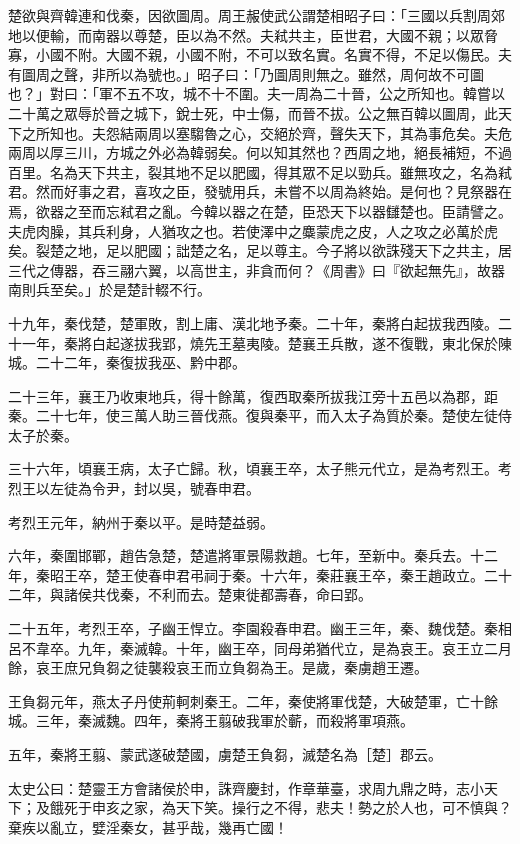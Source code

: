 \begin{pinyinscope}
楚欲與齊韓連和伐秦，因欲圖周。周王赧使武公謂楚相昭子曰：「三國以兵割周郊地以便輸，而南器以尊楚，臣以為不然。夫弒共主，臣世君，大國不親；以眾脅寡，小國不附。大國不親，小國不附，不可以致名實。名實不得，不足以傷民。夫有圖周之聲，非所以為號也。」昭子曰：「乃圖周則無之。雖然，周何故不可圖也？」對曰：「軍不五不攻，城不十不圍。夫一周為二十晉，公之所知也。韓嘗以二十萬之眾辱於晉之城下，銳士死，中士傷，而晉不拔。公之無百韓以圖周，此天下之所知也。夫怨結兩周以塞騶魯之心，交絕於齊，聲失天下，其為事危矣。夫危兩周以厚三川，方城之外必為韓弱矣。何以知其然也？西周之地，絕長補短，不過百里。名為天下共主，裂其地不足以肥國，得其眾不足以勁兵。雖無攻之，名為弒君。然而好事之君，喜攻之臣，發號用兵，未嘗不以周為終始。是何也？見祭器在焉，欲器之至而忘弒君之亂。今韓以器之在楚，臣恐天下以器讎楚也。臣請譬之。夫虎肉臊，其兵利身，人猶攻之也。若使澤中之麋蒙虎之皮，人之攻之必萬於虎矣。裂楚之地，足以肥國；詘楚之名，足以尊主。今子將以欲誅殘天下之共主，居三代之傳器，吞三翮六翼，以高世主，非貪而何？《周書》曰『欲起無先』，故器南則兵至矣。」於是楚計輟不行。

十九年，秦伐楚，楚軍敗，割上庸、漢北地予秦。二十年，秦將白起拔我西陵。二十一年，秦將白起遂拔我郢，燒先王墓夷陵。楚襄王兵散，遂不復戰，東北保於陳城。二十二年，秦復拔我巫、黔中郡。

二十三年，襄王乃收東地兵，得十餘萬，復西取秦所拔我江旁十五邑以為郡，距秦。二十七年，使三萬人助三晉伐燕。復與秦平，而入太子為質於秦。楚使左徒侍太子於秦。

三十六年，頃襄王病，太子亡歸。秋，頃襄王卒，太子熊元代立，是為考烈王。考烈王以左徒為令尹，封以吳，號春申君。

考烈王元年，納州于秦以平。是時楚益弱。

六年，秦圍邯鄲，趙告急楚，楚遣將軍景陽救趙。七年，至新中。秦兵去。十二年，秦昭王卒，楚王使春申君弔祠于秦。十六年，秦莊襄王卒，秦王趙政立。二十二年，與諸侯共伐秦，不利而去。楚東徙都壽春，命曰郢。

二十五年，考烈王卒，子幽王悍立。李園殺春申君。幽王三年，秦、魏伐楚。秦相呂不韋卒。九年，秦滅韓。十年，幽王卒，同母弟猶代立，是為哀王。哀王立二月餘，哀王庶兄負芻之徒襲殺哀王而立負芻為王。是歲，秦虜趙王遷。

王負芻元年，燕太子丹使荊軻刺秦王。二年，秦使將軍伐楚，大破楚軍，亡十餘城。三年，秦滅魏。四年，秦將王翦破我軍於蘄，而殺將軍項燕。

五年，秦將王翦、蒙武遂破楚國，虜楚王負芻，滅楚名為［楚］郡云。

太史公曰：楚靈王方會諸侯於申，誅齊慶封，作章華臺，求周九鼎之時，志小天下；及餓死于申亥之家，為天下笑。操行之不得，悲夫！勢之於人也，可不慎與？棄疾以亂立，嬖淫秦女，甚乎哉，幾再亡國！


\end{pinyinscope}